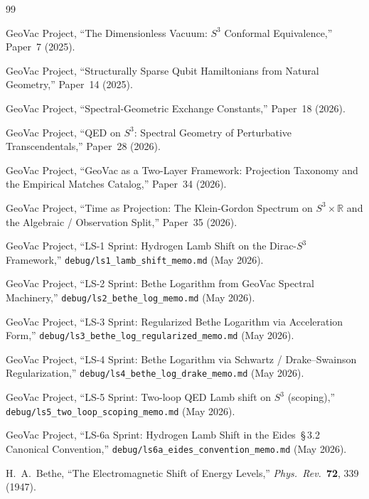 \documentclass[11pt]{article}
\begin{document}
\begin{thebibliography}{99}

GeoVac Project, ``The Dimensionless Vacuum: $S^3$ Conformal
Equivalence,'' Paper~7 (2025).

GeoVac Project, ``Structurally Sparse Qubit Hamiltonians from Natural
Geometry,'' Paper~14 (2025).

GeoVac Project, ``Spectral-Geometric Exchange Constants,'' Paper~18
(2026).

GeoVac Project, ``QED on $S^3$: Spectral Geometry of Perturbative
Transcendentals,'' Paper~28 (2026).

GeoVac Project, ``GeoVac as a Two-Layer Framework: Projection
Taxonomy and the Empirical Matches Catalog,'' Paper~34 (2026).

GeoVac Project, ``Time as Projection: The Klein-Gordon Spectrum on
$S^3 \times \mathbb{R}$ and the Algebraic / Observation Split,''
Paper~35 (2026).

GeoVac Project, ``LS-1 Sprint: Hydrogen Lamb Shift on the Dirac-$S^3$
Framework,'' \texttt{debug/ls1\_lamb\_shift\_memo.md} (May 2026).

GeoVac Project, ``LS-2 Sprint: Bethe Logarithm from GeoVac Spectral
Machinery,'' \texttt{debug/ls2\_bethe\_log\_memo.md} (May 2026).

GeoVac Project, ``LS-3 Sprint: Regularized Bethe Logarithm via
Acceleration Form,'' \texttt{debug/ls3\_bethe\_log\_regularized\_memo.md}
(May 2026).

GeoVac Project, ``LS-4 Sprint: Bethe Logarithm via Schwartz /
Drake--Swainson Regularization,''
\texttt{debug/ls4\_bethe\_log\_drake\_memo.md} (May 2026).

GeoVac Project, ``LS-5 Sprint: Two-loop QED Lamb shift on $S^3$
(scoping),'' \texttt{debug/ls5\_two\_loop\_scoping\_memo.md} (May 2026).

GeoVac Project, ``LS-6a Sprint: Hydrogen Lamb Shift in the
Eides~\S\,3.2 Canonical Convention,''
\texttt{debug/ls6a\_eides\_convention\_memo.md} (May 2026).

H.~A.~Bethe, ``The Electromagnetic Shift of Energy Levels,''
\textit{Phys.\ Rev.}\ \textbf{72}, 339 (1947).


\end{thebibliography}
\end{document}
